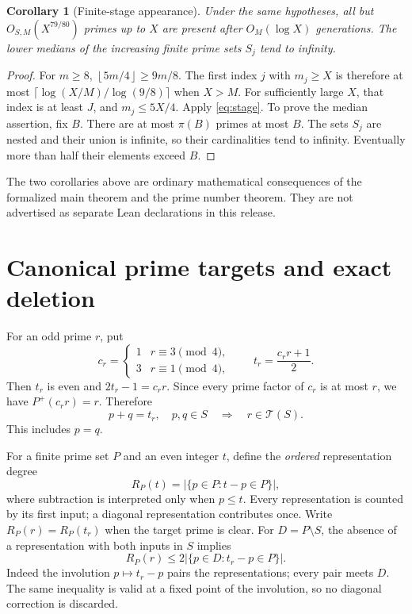 \documentclass[11pt]{article}
\newtheorem{corollary}[theorem]{Corollary}
\theoremstyle{definition}
\theoremstyle{remark}
\newcommand{\cT}{\mathcal T}
\newcommand{\card}[1]{\lvert #1\rvert}
\newcommand{\floor}[1]{\left\lfloor #1\right\rfloor}
\begin{document}
\begin{corollary}[Finite-stage appearance]\label{cor:time}
Under the same hypotheses, all but \(O_{S,M}(X^{79/80})\) primes up to
\(X\) are present after \(O_M(\log X)\) generations. The lower medians
of the increasing finite prime sets \(S_j\) tend to infinity.
\end{corollary}

\begin{proof}
For \(m\ge8\), \(\floor{5m/4}\ge9m/8\). The first index \(j\)
with \(m_j\ge X\) is therefore at most
\(\lceil\log(X/M)/\log(9/8)\rceil\) when \(X>M\).
For sufficiently large \(X\), that index is at least \(J\), and
\(m_j\le5X/4\). Apply \eqref{eq:stage}. To prove the median assertion,
fix \(B\). There are at most \(\pi(B)\) primes at most \(B\).
The sets \(S_j\) are nested and their union is infinite, so their
cardinalities tend to infinity. Eventually more than half their elements
exceed \(B\).
\end{proof}

The two corollaries above are ordinary mathematical consequences of the
formalized main theorem and the prime number theorem. They are not
advertised as separate Lean declarations in this release.

\section{Canonical prime targets and exact deletion}

For an odd prime \(r\), put
\begin{equation}\label{eq:targets}
 c_r=\begin{cases}1&r\equiv3\pmod4,\\3&r\equiv1\pmod4,\end{cases}
 \qquad t_r=\frac{c_rr+1}{2}.
\end{equation}
Then \(t_r\) is even and \(2t_r-1=c_rr\). Since every prime factor of
\(c_r\) is at most \(r\), we have \(P^{+}(c_rr)=r\). Therefore
\begin{equation}\label{eq:target-production}
 p+q=t_r,\quad p,q\in S\quad\Longrightarrow\quad r\in\cT(S).
\end{equation}
This includes \(p=q\).

For a finite prime set \(P\) and an even integer \(t\), define the
\emph{ordered} representation degree
\[
 R_P(t)=\card{\{p\in P:t-p\in P\}},
\]
where subtraction is interpreted only when \(p\le t\).
Every representation is counted by its first input; a diagonal
representation contributes once. Write \(R_P(r)=R_P(t_r)\) when the
target prime is clear. For \(D=P\setminus S\), the absence of a
representation with both inputs in \(S\) implies
\begin{equation}\label{eq:half-deleted}
 R_P(r)\le2\card{\{p\in D:t_r-p\in P\}}.
\end{equation}
Indeed the involution \(p\mapsto t_r-p\) pairs the representations;
every pair meets \(D\). The same inequality is valid at a fixed point
of the involution, so no diagonal correction is discarded.
\end{document}
